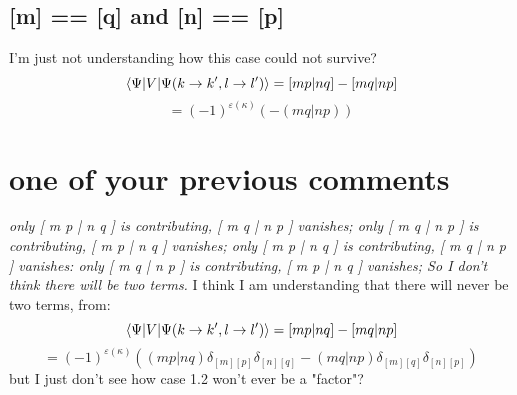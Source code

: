 \documentclass[12pt]{article}
\begin{document}
\subsection{[m] == [q] and [n] == [p]}
I'm just not understanding how this case could not survive?
\begin{equation}
    \mel{\Psi }{V}{\Psi (k\rightarrow k^{\prime}, l\rightarrow l^{\prime})}
    =[mp|nq]-[mq|np]
\end{equation}
\begin{equation}
=(-1)^{\varepsilon (\kappa )}(-(mq|np))
\end{equation}
\section{one of your previous comments}
\emph{only [ m p | n q ] is contributing, [ m q | n p ] vanishes;
only [ m q | n p ] is contributing, [ m p | n q ] vanishes;
only [ m p | n q ] is contributing, [ m q | n p ] vanishes:
only [ m q | n p ] is contributing, [ m p | n q ] vanishes;
So I don't think there will be two terms.}
I think I am understanding that there will never be two terms, from:
\begin{equation}
    \mel{\Psi }{V}{\Psi (k\rightarrow k^{\prime}, l\rightarrow l^{\prime})}
    =[mp|nq]-[mq|np]
\end{equation}
\begin{equation}
    =(-1)^{\varepsilon (\kappa )}((mp|nq)\delta _{[m][p]}\delta _{[n][q]}-(mq|np)\delta _{[m][q]}\delta _{[n][p]})
\end{equation}
but I just don't see how case 1.2 won't ever be a "factor"?
 
\end{document}

